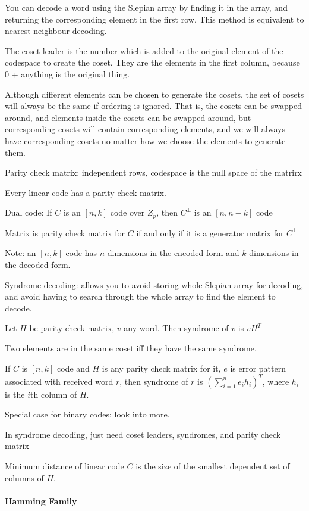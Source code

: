 \documentclass{article}
\begin{document}
You can decode a word using the Slepian array by finding it in the array, and returning the corresponding element in the first row. This method is equivalent to nearest neighbour decoding.

The coset leader is the number which is added to the original element of the codespace to create the coset. They are the elements in the first column, because 0 + anything is the original thing.

Although different elements can be chosen to generate the cosets, the set of cosets will always be the same if ordering is ignored. That is, the cosets can be swapped around, and elements inside the cosets can be swapped around, but corresponding cosets will contain corresponding elements, and we will always have corresponding cosets no matter how we choose the elements to generate them.

Parity check matrix: independent rows, codespace is the null space of the matrirx

Every linear code has a parity check matrix.

Dual code: If $C$ is an $[n,k]$ code over $Z_p$, then $C^\perp$ is an $[n, n - k]$ code

Matrix is parity check matrix for $C$ if and only if it is a generator matrix for $C^\perp$

Note: an $[n,k]$ code has $n$ dimensions in the encoded form and $k$ dimensions in the decoded form.

Syndrome decoding: allows you to avoid storing whole Slepian array for decoding, and avoid having to search through the whole array to find the element to decode.

Let $H$ be parity check matrix, $v$ any word. Then syndrome of $v$ is $vH^T$

Two elements are in the same coset iff they have the same syndrome.

If $C$ is $[n,k]$ code and $H$ is any parity check matrix for it, $e$ is error pattern associated with received word $r$, then syndrome of $r$ is $\left(\sum\limits_{i=1}^n e_i h_i\right)^T$, where $h_i$ is the $i$th column of $H$.

Special case for binary codes: look into more.

In syndrome decoding, just need coset leaders, syndromes, and parity check matrix

Minimum distance of linear code $C$ is the size of the smallest dependent set of columns of $H$.

\paragraph{Hamming Family}
\end{document}
